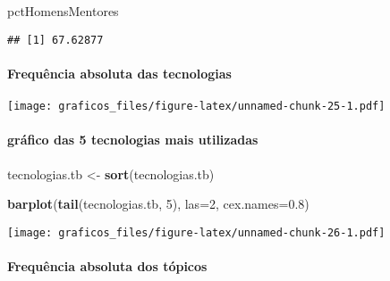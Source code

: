 \documentclass[
]{article}
\newenvironment{Shaded}{\begin{snugshade}}{\end{snugshade}}
\newcommand{\DataTypeTok}[1]{\textcolor[rgb]{0.13,0.29,0.53}{#1}}
\newcommand{\DecValTok}[1]{\textcolor[rgb]{0.00,0.00,0.81}{#1}}
\newcommand{\FloatTok}[1]{\textcolor[rgb]{0.00,0.00,0.81}{#1}}
\newcommand{\KeywordTok}[1]{\textcolor[rgb]{0.13,0.29,0.53}{\textbf{#1}}}
\newcommand{\NormalTok}[1]{#1}
\newcommand{\OperatorTok}[1]{\textcolor[rgb]{0.81,0.36,0.00}{\textbf{#1}}}
\newcommand{\StringTok}[1]{\textcolor[rgb]{0.31,0.60,0.02}{#1}}
\begin{document}
\begin{Shaded}
\begin{Highlighting}[]
\NormalTok{pctHomensMentores}
\end{Highlighting}
\end{Shaded}

\begin{verbatim}
## [1] 67.62877
\end{verbatim}

\hypertarget{frequuxeancia-absoluta-das-tecnologias}{%
\paragraph{Frequência absoluta das
tecnologias}\label{frequuxeancia-absoluta-das-tecnologias}}

\begin{Shaded}
\end{Shaded}

\texttt{[image: graficos\_files/figure-latex/unnamed-chunk-25-1.pdf]}

\hypertarget{gruxe1fico-das-5-tecnologias-mais-utilizadas}{%
\paragraph{gráfico das 5 tecnologias mais
utilizadas}\label{gruxe1fico-das-5-tecnologias-mais-utilizadas}}

\begin{Shaded}
\begin{Highlighting}[]
\NormalTok{tecnologias.tb <-}\StringTok{ }\KeywordTok{sort}\NormalTok{(tecnologias.tb)}

\KeywordTok{barplot}\NormalTok{(}\KeywordTok{tail}\NormalTok{(tecnologias.tb, }\DecValTok{5}\NormalTok{), }\DataTypeTok{las=}\DecValTok{2}\NormalTok{, }\DataTypeTok{cex.names=}\FloatTok{0.8}\NormalTok{)}
\end{Highlighting}
\end{Shaded}

\texttt{[image: graficos\_files/figure-latex/unnamed-chunk-26-1.pdf]}

\hypertarget{frequuxeancia-absoluta-dos-tuxf3picos}{%
\paragraph{Frequência absoluta dos
tópicos}\label{frequuxeancia-absoluta-dos-tuxf3picos}}
\end{document}
